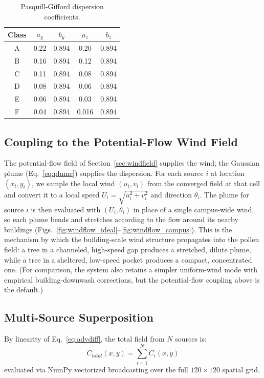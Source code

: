 \documentclass[11pt]{article}
\begin{document}
\begin{table}[h]
\centering
\caption{Pasquill-Gifford dispersion coefficients.}
\label{tab:pg}
\begin{tabular}{@{}ccccc@{}}
\toprule
Class & $a_y$ & $b_y$ & $a_z$ & $b_z$ \\
\midrule
A & 0.22 & 0.894 & 0.20 & 0.894 \\
B & 0.16 & 0.894 & 0.12 & 0.894 \\
C & 0.11 & 0.894 & 0.08 & 0.894 \\
D & 0.08 & 0.894 & 0.06 & 0.894 \\
E & 0.06 & 0.894 & 0.03 & 0.894 \\
F & 0.04 & 0.894 & 0.016 & 0.894 \\
\bottomrule
\end{tabular}
\end{table}

\subsection{Coupling to the Potential-Flow Wind Field}
\label{sec:coupling}

The potential-flow field of Section~\ref{sec:windfield} supplies the wind; the Gaussian plume (Eq.~\eqref{eq:plume}) supplies the dispersion. For each source $i$ at location $(x_i, y_i)$, we sample the local wind $(u_i, v_i)$ from the converged field at that cell and convert it to a local speed $U_i = \sqrt{u_i^2 + v_i^2}$ and direction $\theta_i$. The plume for source $i$ is then evaluated with $(U_i, \theta_i)$ in place of a single campus-wide wind, so each plume bends and stretches according to the flow around its nearby buildings (Figs.~\ref{fig:windflow_ideal}--\ref{fig:windflow_campus}). This is the mechanism by which the building-scale wind structure propagates into the pollen field: a tree in a channeled, high-speed gap produces a stretched, dilute plume, while a tree in a sheltered, low-speed pocket produces a compact, concentrated one. (For comparison, the system also retains a simpler uniform-wind mode with empirical building-downwash corrections, but the potential-flow coupling above is the default.)

\subsection{Multi-Source Superposition}

By linearity of Eq.~\eqref{eq:advdiff}, the total field from $N$ sources is:
\begin{equation}
C_{total}(x,y) = \sum_{i=1}^{N} C_i(x,y)
\label{eq:superposition}
\end{equation}
evaluated via NumPy vectorized broadcasting over the full $120 \times 120$ spatial grid.
\end{document}

